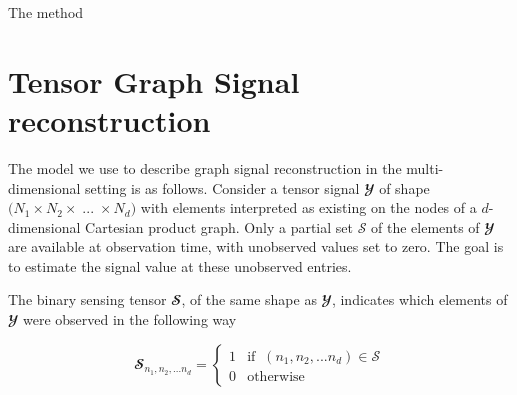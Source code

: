 \begin{algorithm}[t]
\hypertarget{alkronx}{}
\label{al:kronx}
\caption{The  method}
\begin{algorithmic}
\vspace{0.15cm}
\vspace{0.1cm}
\vspace{0.25cm}
\vspace{0.25cm}
\vspace{0.25cm}
\vspace{0.15cm}
\vspace{0.15cm}
\EndFor
\vspace{0.25cm}
\end{algorithmic}
\end{algorithm}

\section{Tensor Graph Signal reconstruction}

The model we use to describe graph signal reconstruction in the multi-dimensional setting is as follows. Consider a tensor signal $\mathbfcal{Y}$ of shape $\big(N_1 \times N_2 \times \; ... \; \times N_d \big)$ with elements interpreted as existing on the nodes of a $d$-dimensional Cartesian product graph. Only a partial set $\mathcal{S}$ of the elements of $\mathbfcal{Y}$ are available at observation time, with unobserved values set to zero. The goal is to estimate the signal value at these unobserved entries. 

The binary sensing tensor $\mathbfcal{S}$, of the same shape as $\mathbfcal{Y}$, indicates which elements of $\mathbfcal{Y}$ were observed in the following way 

\begin{equation}
    \mathbfcal{S}_{n_1,n_2,...n_d} = \begin{cases}
        1 & \text{if} \;\; (n_1,n_2,...n_d) \in \mathcal{S} \\
        0 & \text{otherwise}
    \end{cases}
\end{equation}


